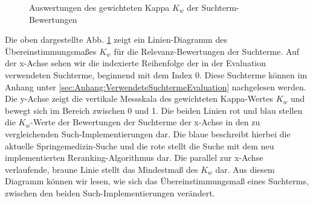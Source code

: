 
\begin{figure}[H]
\centering 
\vspace{-1.5em}
\caption[Auswertungen des gewichteten Kappa $K_w$ der Suchterm-Bewertungen]{Auswertungen des gewichteten Kappa $K_w$ der Suchterm-Bewertungen}
\label{fig:Evaluation:Auswertung:Kappas}

\footnotesize
{}\kappas
\pgfsetplotmarksize{.5pt}
  

\vspace{-2.5em}
\end{figure}

Die oben dargestellte Abb. \ref{fig:Evaluation:Auswertung:Kappas} zeigt ein Linien-Diagramm des Übereinstimmungsmaßes $K_w$ für die Relevanz-Bewertungen der Suchterme. Auf der x-Achse sehen wir die indexierte Reihenfolge der in der Evaluation verwendeten Suchterme, beginnend mit dem Index 0. Diese Suchterme können im Anhang unter \ref{sec:Anhang:VerwendeteSuchtermeEvaluation} nachgelesen werden. Die y-Achse zeigt die vertikale Messskala des gewichteten Kappa-Wertes $K_w$ und bewegt sich im Bereich zwischen 0 und 1. Die beiden Linien rot und blau stellen die $K_w$-Werte der Bewertungen der Suchterme der x-Achse in den zu vergleichenden Such-Implementierungen dar. Die blaue beschreibt hierbei die aktuelle Springemedizin-Suche und die rote stellt die Suche mit dem neu implementierten Reranking-Algorithmus dar. Die parallel zur x-Achse verlaufende, braune Linie stellt das Mindestmaß des $K_w$ dar. Aus diesem Diagramm können wir lesen, wie sich das Übereinstimmungsmaß eines Suchterms, zwischen den beiden Such-Implementierungen verändert. 

